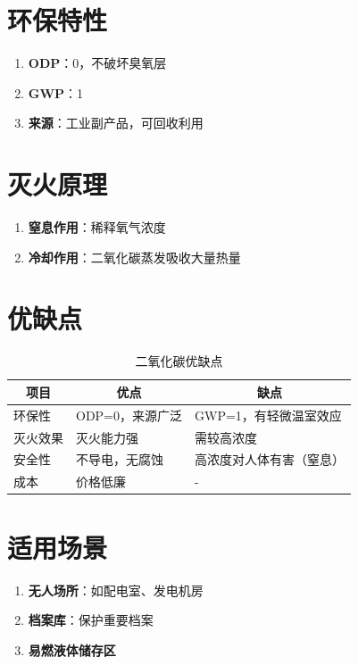 \documentclass[12pt,UTF8]{ctexbook}
\begin{document}
\section{环保特性}

\begin{enumerate}
    \item \textbf{ODP}：0，不破坏臭氧层
    \item \textbf{GWP}：1
    \item \textbf{来源}：工业副产品，可回收利用
\end{enumerate}

\section{灭火原理}

\begin{enumerate}
    \item \textbf{窒息作用}：稀释氧气浓度
    \item \textbf{冷却作用}：二氧化碳蒸发吸收大量热量
\end{enumerate}

\section{优缺点}

\begin{table}[H]
    \centering
    \begin{tabularx}{\textwidth}{|p{3cm}|X|X|}
        \hline
        \multicolumn{1}{|c|}{\textbf{项目}} & \multicolumn{1}{c|}{\textbf{优点}} & \multicolumn{1}{c|}{\textbf{缺点}} \\
        \hline
        环保性 & ODP=0，来源广泛 & GWP=1，有轻微温室效应 \\
        \hline
        灭火效果 & 灭火能力强 & 需较高浓度 \\
        \hline
        安全性 & 不导电，无腐蚀 & 高浓度对人体有害（窒息） \\
        \hline
        成本 & 价格低廉 & - \\
        \hline
    \end{tabularx}
    \caption{二氧化碳优缺点}
    \label{tab:co2_pros_cons}
\end{table}

\section{适用场景}

\begin{enumerate}
    \item \textbf{无人场所}：如配电室、发电机房
    \item \textbf{档案库}：保护重要档案
    \item \textbf{易燃液体储存区}
\end{enumerate}
\end{document}
